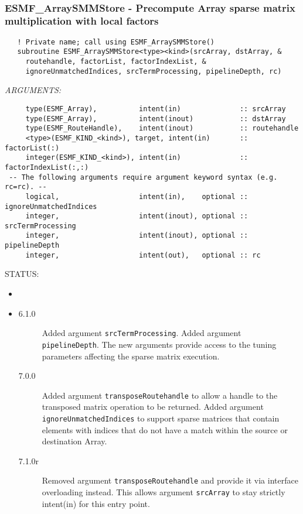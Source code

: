  
\mbox{}\hrulefill\ 
 
\subsubsection [ESMF\_ArraySMMStore] {ESMF\_ArraySMMStore - Precompute Array sparse matrix multiplication with local factors}


  
\begin{verbatim}   ! Private name; call using ESMF_ArraySMMStore()
   subroutine ESMF_ArraySMMStore<type><kind>(srcArray, dstArray, &
     routehandle, factorList, factorIndexList, &
     ignoreUnmatchedIndices, srcTermProcessing, pipelineDepth, rc)\end{verbatim}{\em ARGUMENTS:}
\begin{verbatim}     type(ESMF_Array),          intent(in)              :: srcArray
     type(ESMF_Array),          intent(inout)           :: dstArray
     type(ESMF_RouteHandle),    intent(inout)           :: routehandle
     <type>(ESMF_KIND_<kind>), target, intent(in)       :: factorList(:)
     integer(ESMF_KIND_<kind>), intent(in)              :: factorIndexList(:,:)
 -- The following arguments require argument keyword syntax (e.g. rc=rc). --
     logical,                   intent(in),    optional :: ignoreUnmatchedIndices
     integer,                   intent(inout), optional :: srcTermProcessing
     integer,                   intent(inout), optional :: pipelineDepth
     integer,                   intent(out),   optional :: rc\end{verbatim}
{\sf STATUS:}
   \begin{itemize}
   \item{}
   \item{}
   \begin{description}
   \item[6.1.0] Added argument {\tt srcTermProcessing}.
                Added argument {\tt pipelineDepth}.
                The new arguments provide access to the tuning parameters
                affecting the sparse matrix execution.
   \item[7.0.0] Added argument {\tt transposeRoutehandle} to allow a handle to
                the transposed matrix operation to be returned.\newline
                Added argument {\tt ignoreUnmatchedIndices} to support sparse 
                matrices that contain elements with indices that do not have a
                match within the source or destination Array.
   \item[7.1.0r] Removed argument {\tt transposeRoutehandle} and provide it
                via interface overloading instead. This allows argument 
                {\tt srcArray} to stay strictly intent(in) for this entry point.
   \end{description}
   \end{itemize}
  
